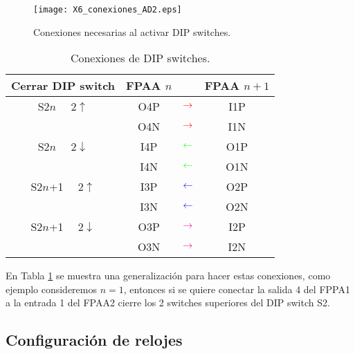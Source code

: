 	\begin{figure}[!h]
		\caption{Conexiones necesarias al activar DIP switches.}
		\label{fig:X6_conexiones_AD2}
		\centering
		\texttt{[image: X6\_conexiones\_AD2.eps]}
	\end{figure}
	
	\begin{table}[!ht]                                      
		\centering   
		\caption{Conexiones de DIP switches.}                            
		\label{tab:DIP_switches_code}                                       
			\begin{tabular}{c c c c}                        
			\hline                                              
			Cerrar DIP switch & FPAA $n$ & & FPAA $n+1$\\            
			\hline       
			{\color{red} S$2n$ $\quad2\uparrow$}  &{\color{red} O4P} & ${\color{red} \rightarrow}$& {\color{red} I1P}\\  
											&{\color{red} O4N} & ${\color{red} \rightarrow}$& {\color{red} I1N}\\ 
			{\color{green} S$2n$ $\quad2\downarrow$}&{\color{green} I4P} & ${\color{green} \leftarrow}$& {\color{green} O1P}\\  
											&{\color{green} I4N} & ${\color{green} \leftarrow}$& {\color{green} O1N}\\  
			                                
			{\color{blue} S$2n$+1 $\quad2\uparrow$} &{\color{blue} I3P} & ${\color{blue} \leftarrow}$& {\color{blue} O2P}\\  
			 								&{\color{blue} I3N} & ${\color{blue} \leftarrow}$& {\color{blue} O2N}\\
			{\color{magenta} S$2n$+1 $\quad2\downarrow$}&{\color{magenta} O3P} & ${\color{magenta} \rightarrow}$& {\color{magenta} I2P}\\  
											&{\color{magenta} O3N} & ${\color{magenta} \rightarrow}$& {\color{magenta} I2N}\\ 
			\hline                                 
			\end{tabular}                                                             
	\end{table}
	
	En Tabla \ref{tab:DIP_switches_code} se muestra una generalización para hacer estas conexiones, como ejemplo consideremos $n = 1$, entonces si se quiere conectar la salida 4 del FPPA1 a la entrada 1 del FPAA2 cierre los 2 switches superiores del DIP switch S2.
		\subsection{Configuración de relojes}
	
